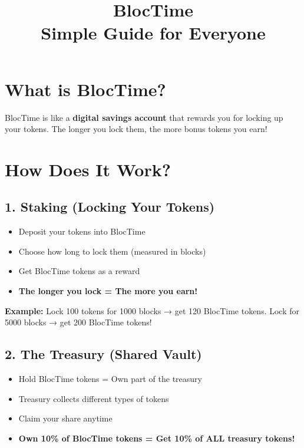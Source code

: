 \documentclass[12pt,a4paper]{article}
\title{\Huge\textbf{\textcolor{maincolor}{BlocTime}}\\[0.3cm]\Large Simple Guide for Everyone}
\author{}
\date{}
\begin{document}
\maketitle

\section*{\textcolor{maincolor}{What is BlocTime?}}

BlocTime is like a \textbf{digital savings account} that rewards you for locking up your tokens. The longer you lock them, the more bonus tokens you earn!

\vspace{0.5cm}

\section*{\textcolor{maincolor}{How Does It Work?}}

\subsection*{\textcolor{accentcolor}{1. Staking (Locking Your Tokens)}}

\begin{itemize}
    \item Deposit your tokens into BlocTime
    \item Choose how long to lock them (measured in blocks)
    \item Get BlocTime tokens as a reward
    \item \textbf{The longer you lock = The more you earn!}
\end{itemize}

\textbf{Example:} Lock 100 tokens for 1000 blocks → get 120 BlocTime tokens. Lock for 5000 blocks → get 200 BlocTime tokens!

\subsection*{\textcolor{accentcolor}{2. The Treasury (Shared Vault)}}

\begin{itemize}
    \item Hold BlocTime tokens = Own part of the treasury
    \item Treasury collects different types of tokens
    \item Claim your share anytime
    \item \textbf{Own 10\% of BlocTime tokens = Get 10\% of ALL treasury tokens!}
\end{itemize}
\end{document}

